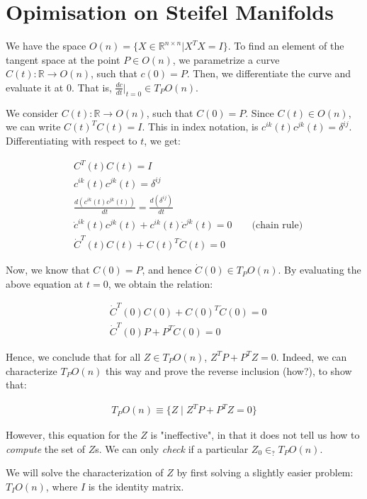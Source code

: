 \documentclass[11pt]{book}
\newcommand{\R}{\ensuremath{\mathbb R}}
\begin{document}
\chapter{Opimisation on Steifel Manifolds}
We have the space $O(n) = \{ X \in \R^{n \times n} | X^T X = I \}$. To find an
element of the tangent space at the point $P \in O(n)$, we parametrize a curve
$C(t) : \R \rightarrow O(n)$, such that $c(0) = P$.  Then, we differentiate the
curve and evaluate it at $0$. That is, $\frac{dc}{dt}\vert_{t=0} \in T_P O(n)$.


We consider $C(t) : \R \rightarrow O(n)$, such that $C(0) = P$.  Since $C(t) \in
O(n)$, we can write $C(t)^T C(t) = I$.  This in index notation, is $c^{ik}(t)
c^{jk}(t) = \delta^{ij}$. Differentiating with respect to $t$, we get:

\begin{align*}
&C^T(t) C(t) = I \\
&c^{ik}(t) c^{jk}(t) = \delta^{ij} \\
&\frac{d (c^{ik}(t) c^{jk}(t))}{dt}= \frac{d(\delta^{ij})}{dt} \\
& \dot c^{ik}(t) c^{jk}(t) + c^{ik}(t) \dot c^{jk}(t) = 0 \qquad \text{(chain rule)}\\
&\dot C^T(t) C(t) + C(t)^T \dot C(t) = 0
\end{align*}

Now, we know that $C(0) = P$, and hence $\dot C(0) \in T_P O(n)$. By evaluating
the above equation at $t = 0$, we obtain the relation:

\begin{align*}
&\dot C^T(0) C(0) + C(0)^T \dot C(0) = 0 \\
&\dot C^T(0) P + P^T \dot C(0) = 0
\end{align*}

Hence, we conclude that for all $Z \in T_P O(n)$, $Z^T P + P^T Z = 0$. Indeed,
we can characterize $T_P O(n)$ this way and prove the reverse inclusion (how?),
to show that:

\begin{align*}
     T_P O(n) \equiv \{ Z \mid Z^T P + P^T Z = 0 \}
\end{align*}

However, this equation for the $Z$ is "ineffective", in that it does not tell
us how to \textit{compute} the set of $Z$s. We can only \textit{check} if a
particular $Z_0 \in_? T_P O(n)$. 

We will solve the characterization of $Z$ by first solving a slightly easier
problem: $T_I O(n)$, where $I$ is the identity matrix. 
\end{document}
